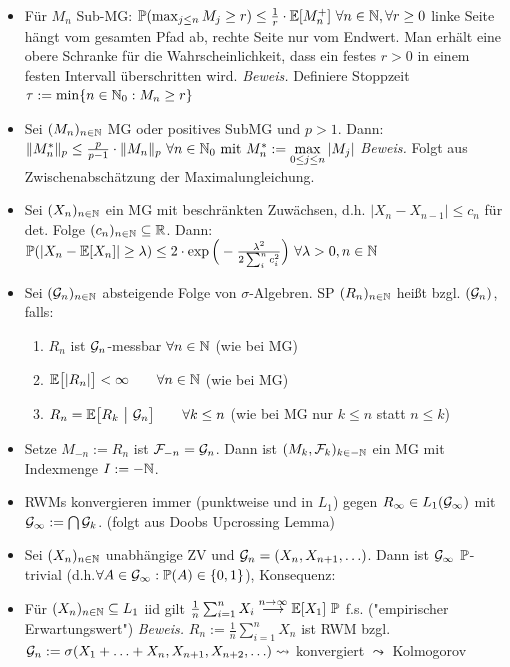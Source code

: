 \documentclass[12pt]{scrartcl}
\begin{document}
	\begin{itemize}
		\item {} Für $M_n$ Sub-MG: $\P(\max_{j\leq n} M_j\geq r)\leq\frac{1}{r}\cdot\E[M_n^+]~\forall n\in\N,\forall r\geq0$
	linke Seite hängt vom gesamten Pfad ab, rechte Seite nur vom Endwert.
	Man erhält eine obere Schranke für die Wahrscheinlichkeit, dass ein festes $r>0$ in einem festen Intervall überschritten wird.
	\textit{Beweis.} Definiere Stoppzeit $\tau:=\min\lbrace n\in\N_0:M_n\geq r\rbrace$
		\item {} Sei $(M_n)_{n\in\N}$ MG oder positives SubMG und $p>1$. Dann:\\
		$\Vert M_n^\ast\Vert_p\leq\frac{p}{p-1}\cdot\Vert M_n\Vert_p~\forall n\in\N_0\mit M_n^\ast:=\max\limits_{0\leq j\leq n}|M_j|$
		\textit{Beweis.} Folgt aus Zwischenabschätzung der Maximalungleichung.
		\item {} Sei $(X_n)_{n\in\N}$ ein MG mit beschränkten Zuwächsen, d.h. $|X_n-X_{n-1}|\leq c_n$ für det. Folge $(c_n)_{n\in\N}\subseteq\R$. Dann:
		$\P(|X_n-\E[X_n]|\geq\lambda)\leq 2\cdot\exp\Big(-\frac{\lambda^2}{2\sum_i^n c_i^2}\Big)~\forall\lambda>0, n\in\N$
		\item Sei $(\G_n)_{n\in\N}$ absteigende Folge von $\sigma$-Algebren. SP $(R_n)_{n\in\N}$ heißt  bzgl. $(\G_n)$, falls:
		\begin{enumerate}
			\item $R_n$ ist $\G_n$-messbar $\forall n\in\N$ (wie bei MG)
			\item $\begin{aligned}
				\E\big[|R_n|\big]<\infty\qquad\forall n\in\N
			\end{aligned}$ (wie bei MG)
			\item $\begin{aligned}
				R_n=\E\big[R_k~\big|~\G_n\big]\qquad\forall k\leq n
			\end{aligned}$ (wie bei MG nur $k\leq n$ statt $n\leq k$)
		\end{enumerate}
		\item Setze $M_{-n}:=R_n$ ist $\F_{-n}=\G_n$. Dann ist $(M_k,\F_k)_{k\in-\N}$ ein MG mit Indexmenge $I:=-\N$.
		\item RWMs konvergieren immer (punktweise und in $L_1$) gegen $R_\infty\in L_1(\G_\infty)$ mit  $\G_\infty:=\bigcap\G_k$. (folgt aus Doobs Upcrossing Lemma)
		\item {} Sei $(X_n)_{n\in\N}$ unabhängige ZV und $\G_n=(X_n,X_{n+1},\ldots)$. Dann ist $\G_\infty$ $\P$-trivial (d.h.$\forall A\in\G_\infty:\P(A)\in\lbrace0,1\rbrace$), Konsequenz:
		\item {} Für $(X_n)_{n\in\N}\subseteq L_1$ iid gilt $\frac{1}{n}\sum_{i=1}^n X_i\overset{n\to\infty}{\longrightarrow}\E[X_1]~\P$ f.s. ("empirischer Erwartungswert")
		\textit{Beweis.} $R_n:=\frac{1}{n}\sum_{i=1}^n X_n$ ist RWM bzgl. $\G_n:=\sigma(X_1+\ldots+X_n,X_{n+1},X_{n+2},\ldots)\leadsto$ konvergiert $\leadsto$ Kolmogorov %
	\end{itemize}
		
\end{document}
